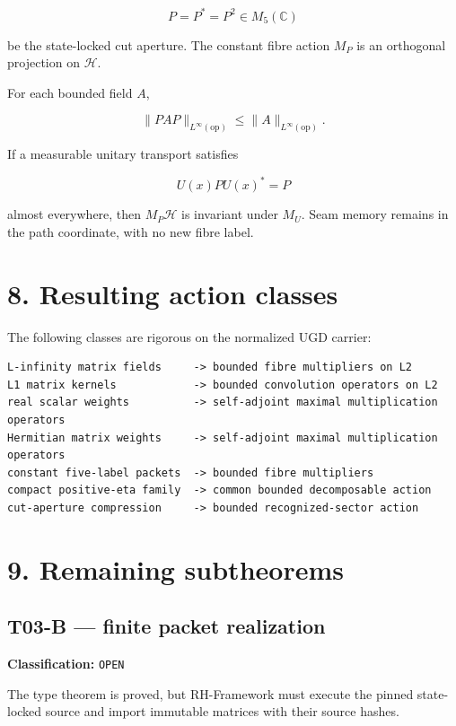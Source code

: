 \[
P=P^*=P^2\in M_5(\mathbb C)
\]

be the state-locked cut aperture. The constant fibre action \(M_P\) is an
orthogonal projection on \(\mathcal H\).

For each bounded field \(A\),

\[
\|PAP\|_{L^\infty(\mathrm{op})}
\le
\|A\|_{L^\infty(\mathrm{op})}.
\]

If a measurable unitary transport satisfies

\[
U(x)PU(x)^*=P
\]

almost everywhere, then \(M_P\mathcal H\) is invariant under \(M_U\). Seam
memory remains in the path coordinate, with no new fibre label.

\hypertarget{resulting-action-classes}{%
\section{8. Resulting action classes}\label{resulting-action-classes}}

The following classes are rigorous on the normalized UGD carrier:

\begin{verbatim}
L-infinity matrix fields     -> bounded fibre multipliers on L2
L1 matrix kernels            -> bounded convolution operators on L2
real scalar weights          -> self-adjoint maximal multiplication operators
Hermitian matrix weights     -> self-adjoint maximal multiplication operators
constant five-label packets  -> bounded fibre multipliers
compact positive-eta family  -> common bounded decomposable action
cut-aperture compression     -> bounded recognized-sector action
\end{verbatim}

\hypertarget{remaining-subtheorems}{%
\section{9. Remaining subtheorems}\label{remaining-subtheorems}}

\hypertarget{t03-b-finite-packet-realization}{%
\subsection{T03-B --- finite packet realization}\label{t03-b-finite-packet-realization}}

\textbf{Classification:} \texttt{OPEN}

The type theorem is proved, but RH-Framework must execute the pinned
state-locked source and import immutable matrices with their source hashes.

